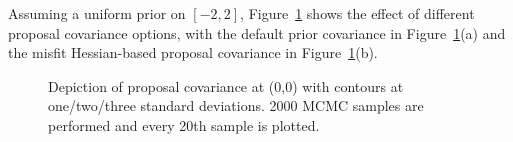 Assuming a uniform prior on $[-2,2]$,
Figure~\ref{fig:rosen_prop_covar} shows the effect of different
proposal covariance options, with the default prior covariance in
Figure~\ref{fig:rosen_prop_covar}(a) and the misfit Hessian-based
proposal covariance in Figure~\ref{fig:rosen_prop_covar}(b).
\begin{figure}[htbp]
  \begin{subfigmatrix}{2}
  \end{subfigmatrix}
  \caption{Depiction of proposal covariance at (0,0) with contours at one/two/three standard deviations.  2000 MCMC samples are performed and every 20th sample is plotted.}
\label{fig:rosen_prop_covar}
\end{figure}
